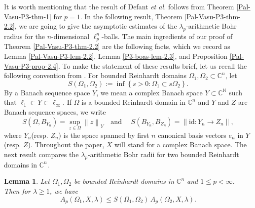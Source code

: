 \documentclass[a4paper,12pt]{amsart}
\newtheorem{lem}[equation]{Lemma}
\theoremstyle{definition}
\newcommand{\norm}[1]{\left\lVert#1\right\rVert}
\begin{document}
\noindent 
It is worth mentioning that the result of Defant {\it et al.} \cite[Proposition 2.2]{defant-2007} follows from Theorem \ref{Pal-Vasu-P3-thm-1} for $p=1$. In the following result, Theorem \ref{Pal-Vasu-P3-thm-2.2}, we are going to give the asymptotic estimates of the $\lambda_p$-arithmetic Bohr radius for the $n$-dimensional $\ell^n_p$-balls. The main ingredients of our proof of Theorem \ref{Pal-Vasu-P3-thm-2.2} are the following facts, which we record as Lemma \ref{Pal-Vasu-P3-lem-2.2}, Lemma \ref{P3-boas-lem-2.3}, and Proposition \ref{Pal-Vasu-P3-prop-2.4}. To make the statement of these results brief, let us recall the following convention from \cite{defant-2007}.
For bounded Reinhardt domains $\Omega_{1}, \Omega_{2}\subset \mathbb{C}^n$, let
\begin{equation*}
	S(\Omega_1, \Omega_{2}):= \inf \left\{s>0 : \Omega_{1} \subset s\Omega_{2}\right\}.
\end{equation*}
 By a Banach sequence space $Y$, we mean a complex Banach space $Y\subset \mathbb{C}^{\mathbb{N}}$ such that $\ell_{1}\subset Y \subset \ell_{\infty}$. If $\Omega$ is a bounded Reinhardt domain in $\mathbb{C}^n$ and $Y$ and $Z$ are Banach sequence spaces, we write
\begin{equation}\label{Pal-Vasu-P3-e-2.1}
	S(\Omega, B_{Y_n})= \sup_{z\in \Omega}\norm{z}_{Y} \quad \mbox{and }\quad  S(B_{Y_n}, B_{Z_n})= \norm{\mbox{id}: Y_n \rightarrow Z_n},
\end{equation}
where $Y_n$(resp. $Z_n$) is the space spanned by first $n$ canonical basis vectors $e_n$ in $Y$(resp. $Z$). Throughout the paper, $X$ will stand for a complex Banach space. The next result compares the $\lambda_p$-arithmetic Bohr radii for two bounded Reinhardt domains in $\mathbb{C}^n$.
\begin{lem}\label{Pal-Vasu-P3-lem-2.1}
	Let $\Omega_{1}, \Omega_{2}$ be bounded Reinhardt domains in $\mathbb{C}^n$ and $1\leq p<\infty$. Then for $\lambda \geq 1$, we have 
	\begin{equation*}
		A_p(\Omega_{1},X, \lambda) \leq S(\Omega_{1}, \Omega_{2})\, A_p(\Omega_{2}, X, \lambda).
	\end{equation*} 
\end{lem}
\end{document}
